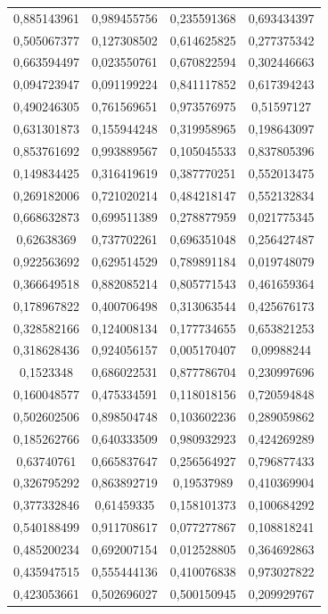 \documentclass[a4paper,12pt]{article}
\begin{document}
\begin{longtable}{|c|c|c|c|}
	0,885143961 & 0,989455756 & 0,235591368 & 0,693434397 \\
	0,505067377 & 0,127308502 & 0,614625825 & 0,277375342 \\
	0,663594497 & 0,023550761 & 0,670822594 & 0,302446663 \\
	0,094723947 & 0,091199224 & 0,841117852 & 0,617394243 \\
	0,490246305 & 0,761569651 & 0,973576975 & 0,51597127 \\
	0,631301873 & 0,155944248 & 0,319958965 & 0,198643097 \\
	0,853761692 & 0,993889567 & 0,105045533 & 0,837805396 \\
	0,149834425 & 0,316419619 & 0,387770251 & 0,552013475 \\
	0,269182006 & 0,721020214 & 0,484218147 & 0,552132834 \\
	0,668632873 & 0,699511389 & 0,278877959 & 0,021775345 \\
	0,62638369  & 0,737702261 & 0,696351048 & 0,256427487 \\
	0,922563692 & 0,629514529 & 0,789891184 & 0,019748079 \\
	0,366649518 & 0,882085214 & 0,805771543 & 0,461659364 \\
	0,178967822 & 0,400706498 & 0,313063544 & 0,425676173 \\
	0,328582166 & 0,124008134 & 0,177734655 & 0,653821253 \\
	0,318628436 & 0,924056157 & 0,005170407 & 0,09988244 \\
	0,1523348   & 0,686022531 & 0,877786704 & 0,230997696 \\
	0,160048577 & 0,475334591 & 0,118018156 & 0,720594848 \\
	0,502602506 & 0,898504748 & 0,103602236 & 0,289059862 \\
	0,185262766 & 0,640333509 & 0,980932923 & 0,424269289 \\
	0,63740761 & 0,665837647 & 0,256564927 & 0,796877433 \\
	0,326795292 & 0,863892719 & 0,19537989 & 0,410369904 \\
	0,377332846 & 0,61459335 & 0,158101373 & 0,100684292 \\
	0,540188499 & 0,911708617 & 0,077277867 & 0,108818241 \\
	0,485200234 & 0,692007154 & 0,012528805 & 0,364692863 \\
	0,435947515 & 0,555444136 & 0,410076838 & 0,973027822 \\
	0,423053661 & 0,502696027 & 0,500150945 & 0,209929767 \\

\end{longtable}
\end{document}
